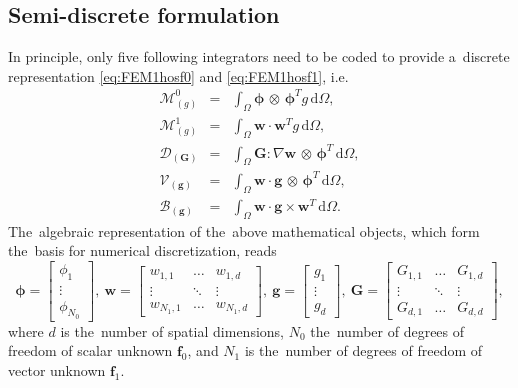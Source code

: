 \documentclass[preprint,12pt]{elsarticle}
\newcommand{\vect}[1]{\boldsymbol{#1}}
\newcommand{\matr}[1]{\mathbf{#1}}
\newcommand{\dI}{\text{d}}
\newcommand{\vfzero}{\vect{f}_0}
\newcommand{\fone}{\vect{f}_1}
\newcommand{\intO}{\int_{\Omega}}
\newcommand{\IM}{\boldsymbol{\mathcal{M}}}
\newcommand{\ID}{\boldsymbol{\mathcal{D}}}
\newcommand{\IV}{\boldsymbol{\mathcal{V}}}
\newcommand{\IB}{\boldsymbol{\mathcal{B}}}
\newcounter{bla}
\begin{document}
\subsection{Semi-discrete formulation}\label{sec:semidiscrete_form}

In principle, only five following integrators need to be coded to provide
a~discrete representation \eqref{eq:FEM1hosf0} and \eqref{eq:FEM1hosf1}, i.e.
\begin{eqnarray}
  \IM^0_{(g)} &=& \intO\vect{\phi}\, \otimes\, \vect{\phi}^T g\, \dI \Omega ,
  \label{eq:IM0}\\
  \IM^1_{(g)} &=& \intO\matr{w} \cdot \matr{w}^T g\, \dI\Omega ,
  \label{eq:IM1}\\
  \ID_{(\matr{G})} &=& \intO \matr{G} : \nabla\matr{w}
  \, \otimes\, \vect{\phi}^T\, \dI \Omega ,
  \label{eq:ID}\\
  \IV_{(\vect{g})} &=& \intO\matr{w} \cdot
  \vect{g}\, \otimes\, \vect{\phi}^T\, \dI \Omega ,
  \label{eq:IV}\\
  \IB_{(\vect{g})} &=& \intO\matr{w} \cdot
  \vect{g} \times \matr{w}^T\, \dI \Omega .
  \label{eq:IB}
\end{eqnarray}
The~algebraic representation of the~above mathematical objects, which
form the~basis for numerical discretization, reads 
\begin{equation}
  \vect{\phi} = \begin{bmatrix}
    \phi_{1} \\
	\vdots   \\
	\phi_{N_0}
  \end{bmatrix},~
  \matr{w} = \begin{bmatrix}
    w_{1, 1} & \hdots & w_{1, d} \\
	\vdots   & \ddots & \vdots \\
	w_{N_1, 1} & \hdots & w_{N_1, d}
  \end{bmatrix},~
  \vect{g} = \begin{bmatrix}
    g_{1} \\
	\vdots   \\
	g_{d}
  \end{bmatrix},~
  \matr{G} = \begin{bmatrix}
    G_{1, 1} & \hdots & G_{1, d} \\
	\vdots   & \ddots & \vdots \\
	G_{d, 1} & \hdots & G_{d, d}
  \end{bmatrix},
\end{equation}
where $d$ is the~number of spatial dimensions, $N_0$ the~number of
degrees of freedom of scalar unknown $\vfzero$, and $N_1$ is the~number
of degrees of freedom of vector unknown $\fone$.
\end{document}
